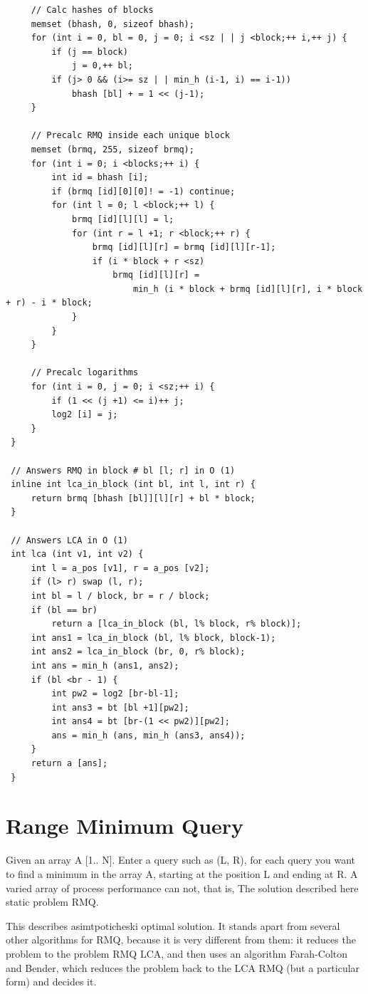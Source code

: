 \begin{verbatim}
     // Calc hashes of blocks
     memset (bhash, 0, sizeof bhash);
     for (int i = 0, bl = 0, j = 0; i <sz | | j <block;++ i,++ j) {
         if (j == block)
             j = 0,++ bl;
         if (j> 0 && (i>= sz | | min_h (i-1, i) == i-1))
             bhash [bl] + = 1 << (j-1);
     }

     // Precalc RMQ inside each unique block
     memset (brmq, 255, sizeof brmq);
     for (int i = 0; i <blocks;++ i) {
         int id = bhash [i];
         if (brmq [id][0][0]! = -1) continue;
         for (int l = 0; l <block;++ l) {
             brmq [id][l][l] = l;
             for (int r = l +1; r <block;++ r) {
                 brmq [id][l][r] = brmq [id][l][r-1];
                 if (i * block + r <sz)
                     brmq [id][l][r] =
                         min_h (i * block + brmq [id][l][r], i * block + r) - i * block;
             }
         }
     }

     // Precalc logarithms
     for (int i = 0, j = 0; i <sz;++ i) {
         if (1 << (j +1) <= i)++ j;
         log2 [i] = j;
     }
 }

 // Answers RMQ in block # bl [l; r] in O (1)
 inline int lca_in_block (int bl, int l, int r) {
     return brmq [bhash [bl]][l][r] + bl * block;
 }

 // Answers LCA in O (1)
 int lca (int v1, int v2) {
     int l = a_pos [v1], r = a_pos [v2];
     if (l> r) swap (l, r);
     int bl = l / block, br = r / block;
     if (bl == br)
         return a [lca_in_block (bl, l% block, r% block)];
     int ans1 = lca_in_block (bl, l% block, block-1);
     int ans2 = lca_in_block (br, 0, r% block);
     int ans = min_h (ans1, ans2);
     if (bl <br - 1) {
         int pw2 = log2 [br-bl-1];
         int ans3 = bt [bl +1][pw2];
         int ans4 = bt [br-(1 << pw2)][pw2];
         ans = min_h (ans, min_h (ans3, ans4));
     }
     return a [ans];
 } 
\end{verbatim}

\section{ Range Minimum Query }
Given an array A [1.. N]. Enter a query such as (L, R), for each query you want to find a minimum in the array A, starting at the position L and ending at R. A varied array of process performance can not, that is, The solution described here static problem RMQ.

This describes asimtpoticheski optimal solution. It stands apart from several other algorithms for RMQ, because it is very different from them: it reduces the problem to the problem RMQ LCA, and then uses an algorithm Farah-Colton and Bender, which reduces the problem back to the LCA RMQ (but a particular form) and decides it.

